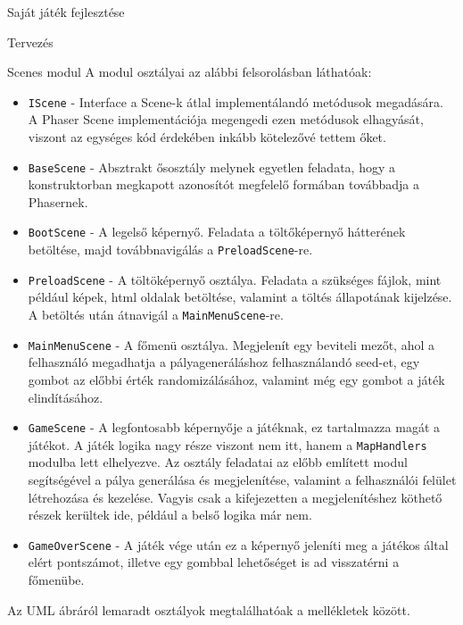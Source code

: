\begin{MyChapter}{Saját játék fejlesztése}
\begin{MySection}{Tervezés}
\begin{MySubSection}{Scenes modul}
			A modul osztályai az alábbi felsorolásban láthatóak:
			\begin{itemize}
				\item \texttt{IScene} - Interface a Scene-k átlal implementálandó metódusok megadására. A Phaser Scene implementációja megengedi ezen metódusok elhagyását, viszont az egységes kód érdekében inkább kötelezővé tettem őket.
				
				\item \texttt{BaseScene} - Absztrakt ősosztály melynek egyetlen feladata, hogy a konstruktorban megkapott azonosítót megfelelő formában továbbadja a Phasernek.
				
				\item \texttt{BootScene} - A legelső képernyő. Feladata a töltőképernyő hátterének betöltése, majd továbbnavigálás a \texttt{PreloadScene}-re.
				
				\item \texttt{PreloadScene} - A töltöképernyő osztálya. Feladata a szükséges fájlok, mint például képek, html oldalak betöltése, valamint a töltés állapotának kijelzése. A betöltés után átnavigál a \texttt{MainMenuScene}-re.
				
				\item \texttt{MainMenuScene} - A főmenü osztálya. Megjelenít egy beviteli mezőt, ahol a felhasználó megadhatja a pályageneráláshoz felhasználandó seed-et, egy gombot az előbbi érték randomizálásához, valamint még egy gombot a játék elindításához.
				
				\item \texttt{GameScene} - A legfontosabb képernyője a játéknak, ez tartalmazza magát a játékot. A játék logika nagy része viszont nem itt, hanem a \texttt{MapHandlers} modulba lett elhelyezve. Az osztály feladatai az előbb említett modul segítségével a pálya generálása és megjelenítése, valamint a felhasználói felület létrehozása és kezelése. Vagyis csak a kifejezetten a megjelenítéshez köthető részek kerültek ide, például a belső logika már nem.
				
				\item \texttt{GameOverScene} - A játék vége után ez a képernyő jeleníti meg a játékos által elért pontszámot, illetve egy gombbal lehetőséget is ad visszatérni a főmenübe.
			\end{itemize}
			
			Az UML ábráról lemaradt osztályok megtalálhatóak a mellékletek között.
		\end{MySubSection}
	

\end{MySection}
\end{MyChapter}
